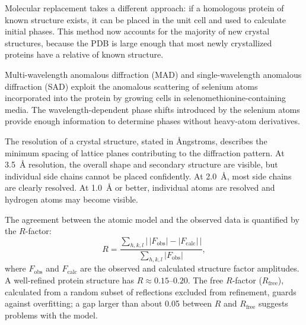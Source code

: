 Molecular replacement takes a different approach: if a homologous protein of known structure exists, it can be placed in the unit cell and used to calculate initial phases.  This method now accounts for the majority of new crystal structures, because the PDB is large enough that most newly crystallized proteins have a relative of known structure.

Multi-wavelength anomalous diffraction (MAD) and single-wavelength anomalous diffraction (SAD) exploit the anomalous scattering of selenium atoms incorporated into the protein by growing cells in selenomethionine-containing media.  The wavelength-dependent phase shifts introduced by the selenium atoms provide enough information to determine phases without heavy-atom derivatives.

  The resolution of a crystal structure, stated in \AA ngstroms, describes the minimum spacing of lattice planes contributing to the diffraction pattern.  At 3.5~\AA{} resolution, the overall shape and secondary structure are visible, but individual side chains cannot be placed confidently.  At 2.0~\AA, most side chains are clearly resolved.  At 1.0~\AA{} or better, individual atoms are resolved and hydrogen atoms may become visible.

The agreement between the atomic model and the observed data is quantified by the $R$-factor:
\begin{equation}
  R = \frac{\sum_{h,k,l} \bigl|\, |F_{\text{obs}}| - |F_{\text{calc}}| \,\bigr|}
           {\sum_{h,k,l} |F_{\text{obs}}|},
  \label{eq:rfactor-xray-intro}
\end{equation}
where $F_{\text{obs}}$ and $F_{\text{calc}}$ are the observed and calculated structure factor amplitudes.  A well-refined protein structure has $R \approx 0.15$--$0.20$.  The free $R$-factor ($R_{\text{free}}$), calculated from a random subset of reflections excluded from refinement, guards against overfitting; a gap larger than about 0.05 between $R$ and $R_{\text{free}}$ suggests problems with the model.


